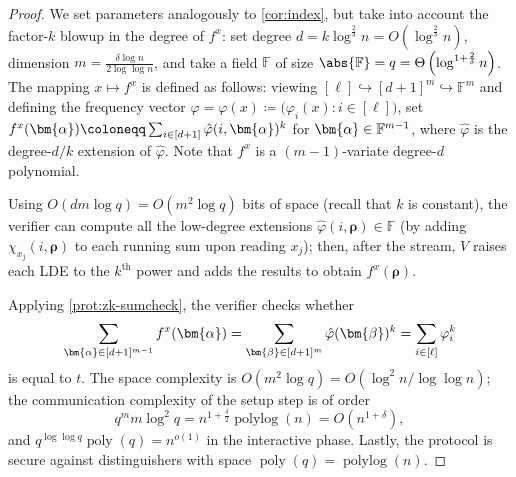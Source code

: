 \documentclass[10pt,a4paper]{article}
\theoremstyle{definition}
\newcommand{\field}{\mathbb{F}}
\newcommand{\poly}{\operatorname{poly}}
\newcommand{\polylog}{\operatorname{polylog}}
\newcommand{\dimension}{m}
\newcommand{\degree}{d}
\newcommand{\fieldsize}{q}
\newcommand{\evaluationpoint}{\bm{\fe2}}
\newcommand{\fingerprinttuple}{\bm{\rho}}
\def\fe#1{
    \ifnum#1=1
        \alpha
    \else
    \ifnum#1=2
        \beta
    \else
    \ifnum#1=3
        \gamma
    \fi\fi\fi
}
\begin{document}
\begin{proof}
    We set parameters analogously to \cref{cor:index}, but take into account the factor-$k$ blowup in the degree of $f^x$: set degree $\degree = k \log^{\frac{2}{\delta}} n = O\left(\log^{\frac{2}{\delta}} n\right)$, dimension $\dimension = \frac{\delta \log n}{2\log\log n}$, and take a field $\field$ of size $\abs{\field} = \fieldsize = \Theta\left(\log^{1 + \frac{2}{\delta}} n\right)$. The mapping $x \mapsto f^x$ is defined as follows: viewing $[\ell] \hookrightarrow [\degree + 1]^\dimension \hookrightarrow \field^\dimension$ and defining the frequency vector $\varphi = \varphi(x) \coloneqq \big(\varphi_i(x) : i \in [\ell]\big)$, set $f^x(\bm{\fe1}) \coloneqq \sum_{i \in [\degree + 1]} \hat \varphi(i, \bm{\fe1})^k$ for $\bm{\fe1} \in \field^{\dimension - 1}$, where $\hat \varphi$ is the degree-$d/k$ extension of $\hat \varphi$. Note that $f^x$ is a $(\dimension - 1)$-variate degree-$\degree$ polynomial.
    
    Using $O(\degree\dimension \log \fieldsize) = O(\dimension^2 \log \fieldsize)$ bits of space (recall that $k$ is constant), the verifier can compute all the low-degree extensions $\hat \varphi(i, \fingerprinttuple) \in \field$ (by adding $\chi_{x_j}(i, \fingerprinttuple)$ to each running sum upon reading $x_j$); then, after the stream, $V$ raises each LDE to the $k^\text{th}$ power and adds the results to obtain $f^x(\fingerprinttuple)$.
    
    Applying \cref{prot:zk-sumcheck}, the verifier checks whether
    \begin{equation*}
        \sum_{\bm{\fe1} \in [\degree + 1]^{\dimension - 1}} f^x(\bm{\fe1}) = \sum_{\evaluationpoint \in [\degree + 1]^\dimension} \hat \varphi (\evaluationpoint)^k = \sum_{i \in [\ell]} \varphi_i^k
    \end{equation*}
    is equal to $t$. The space complexity is $O(\dimension^2 \log \fieldsize) = O(\log^2 n / \log\log n)$; the communication complexity of the setup step is of order
    \begin{equation*}
        \fieldsize^\dimension \dimension \log^2 \fieldsize = n^{1 + \frac{\delta}{2}}\polylog(n) = O\left(n^{1 + \delta}\right),
    \end{equation*}
    and $\fieldsize^{\log\log \fieldsize} \poly(\fieldsize) = n^{o(1)}$ in the interactive phase. Lastly, the protocol is secure against distinguishers with space $\poly(\fieldsize) = \polylog(n)$.
\end{proof}
\end{document}
